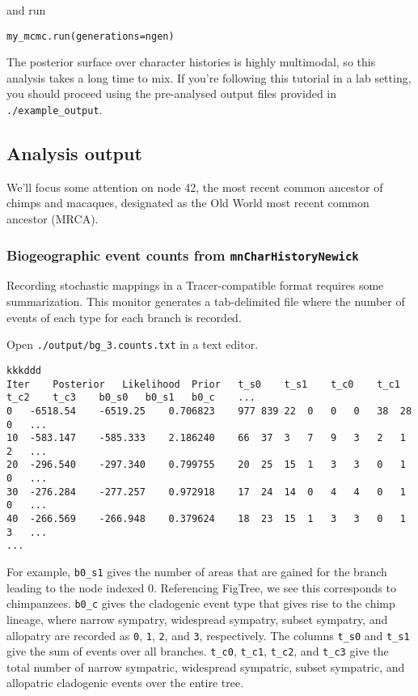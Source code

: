 and run

\begin{snugshade}
\begin{lstlisting}
my_mcmc.run(generations=ngen)
\end{lstlisting}
\end{snugshade}

The posterior surface over character histories is highly multimodal, so this analysis takes a long time to mix.
If you're following this tutorial in a lab setting, you should proceed using the pre-analysed output files provided in {\tt ./example\_output}.





\subsection{Analysis output}
\label{sec:bg_out}

We'll focus some attention on node 42, the most recent common ancestor of chimps and macaques, designated as the Old World most recent common ancestor (MRCA).

\subsubsection{Biogeographic event counts from {\tt mnCharHistoryNewick}}

Recording stochastic mappings in a Tracer-compatible format requires some summarization.
This monitor generates a tab-delimited file where the number of events of each type for each branch is recorded.

Open {\tt ./output/bg\_3.counts.txt} in a text editor.

\begin{framed}
\begin{lstlisting}[style=textboxSmall]  % \listingsfont, columns=texcl]
kkkddd
Iter	Posterior	Likelihood	Prior	t_s0	t_s1	t_c0	t_c1	t_c2	t_c3	b0_s0	b0_s1	b0_c	...
0	-6518.54	-6519.25	0.706823	977	839	22	0	0	0	38	28	0	...
10	-583.147	-585.333	2.186240	66	37	3	7	9	3	2	1	2	...
20	-296.540	-297.340	0.799755	20	25	15	1	3	3	0	1	0	...
30	-276.284	-277.257	0.972918	17	24	14	0	4	4	0	1	0	...
40	-266.569	-266.948	0.379624	18	23	15	1	3	3	0	1	3	...
...
\end{lstlisting}
\end{framed}

For example, {\tt b0\_s1} gives the number of areas that are gained for the branch leading to the node indexed 0.
Referencing FigTree, we see this corresponds to chimpanzees.
{\tt b0\_c} gives the cladogenic event type that gives rise to the chimp lineage, where narrow sympatry, widespread sympatry, subset sympatry, and allopatry are recorded as {\tt 0}, {\tt 1}, {\tt 2}, and {\tt 3}, respectively. The columns {\tt t\_s0} and {\tt t\_s1} give the sum of events over all branches. {\tt t\_c0}, {\tt t\_c1}, {\tt t\_c2}, and {\tt t\_c3} give the total number of narrow sympatric, widespread sympatric, subset sympatric, and allopatric cladogenic events over the entire tree.

